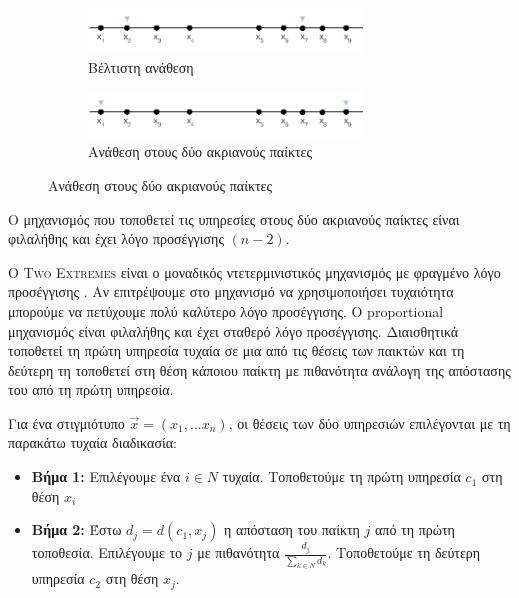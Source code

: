 \begin{figure}[ht]
    \begin{subfigure}[b]{\textwidth}
        \centering
        \includegraphics[width=0.8\textwidth]{Images/OPT2.png}
        \caption{Βέλτιστη ανάθεση}
        \label{fig:opt2}
     \end{subfigure}
    \hspace{20pt}
     \begin{subfigure}[b]{\textwidth}
        \centering
        \includegraphics[width=0.8\textwidth]{Images/TwoExtremes.png}
        \caption{Ανάθεση στους δύο ακριανούς παίκτες}
        \label{fig:twoEx}
    \end{subfigure}
\end{figure}

\begin{theoremgr}
Ο μηχανισμός που τοποθετεί τις υπηρεσίες στους δύο ακριανούς παίκτες είναι φιλαλήθης και έχει λόγο προσέγγισης $(n-2)$. 
\end{theoremgr}

Ο \textsc{Two Extremes} είναι ο μοναδικός ντετερμινιστικός μηχανισμός με φραγμένο λόγο προσέγγισης \cite{Fotakis2014}. Αν επιτρέψουμε στο μηχανισμό να χρησιμοποιήσει τυχαιότητα μπορούμε να πετύχουμε πολύ καλύτερο λόγο προσέγγισης. Ο proportional μηχανισμός είναι φιλαλήθης και έχει σταθερό λόγο προσέγγισης. Διαισθητικά τοποθετεί τη πρώτη υπηρεσία τυχαία σε μια από τις θέσεις των παικτών και τη δεύτερη τη τοποθετεί στη θέση κάποιου παίκτη με πιθανότητα ανάλογη της απόστασης του από τη πρώτη υπηρεσία.

\begin{definitiongr}
Για ένα στιγμιότυπο $\vec{x}=(x_1,...x_n)$, οι θέσεις των δύο υπηρεσιών επιλέγονται με τη παρακάτω τυχαία διαδικασία:
\begin{itemize}
    \item\textbf{Βήμα 1:} Επιλέγουμε ένα $i\in N$ τυχαία. Τοποθετούμε τη πρώτη υπηρεσία  $c_1$ στη θέση $x_i$

    \item\textbf{Βήμα 2:} Έστω $d_j = d(c_1,x_j)$ η απόσταση του παίκτη $j$ από τη πρώτη τοποθεσία. Επιλέγουμε το $j$ με πιθανότητα $\frac{d_j}{\sum_{k\in N}d_k}$. Τοποθετούμε τη δεύτερη υπηρεσία $c_2$ στη θέση $x_j$.
\end{itemize}
\end{definitiongr}

